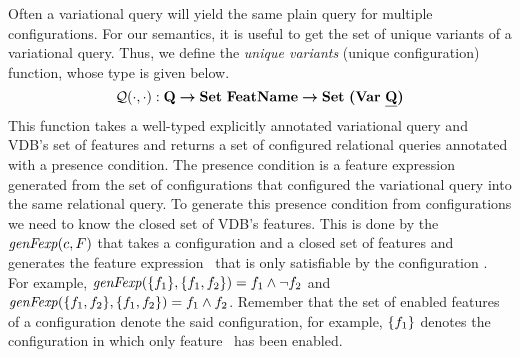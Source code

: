 


Often a variational query will yield the same plain query for multiple configurations.
For our semantics, it is useful to get the set of unique variants of a variational query.
Thus, we define the \emph{unique variants} (unique configuration) function, whose type is given below.
\[
\qGroup[\cdot]{\cdot} : \qSet \totype \settype \fSet \totype \settype {\bm{(} \vartype \pQSet \bm{)}}
\]
This function takes a well-typed explicitly annotated variational query and VDB's set of features
and returns a set of configured relational queries annotated with
a presence condition. The presence condition is a feature expression generated from
the set of configurations that configured the variational query into the same relational query.
To generate this presence condition from configurations we need to know the closed 
set of VDB's features.
%
This is done by the $\mathit{genFexp} (\config,\features)$ that takes a configuration and a closed set of 
features and generates the feature expression \dimMeta\ that is only satisfiable by the configuration
\config. For example, $\mathit{genFexp} (\setDef {\A},\setDef {\A, \B}) = \A \wedge \neg \B$ and
$\mathit{genFexp} (\setDef {\A, \B},\setDef {\A, \B}) = \A \wedge \B$.
%
Remember that the set of enabled features of a configuration denote the said configuration,
for example, $\setDef {\A}$ denotes the configuration in which only feature \A\ has been 
enabled.


